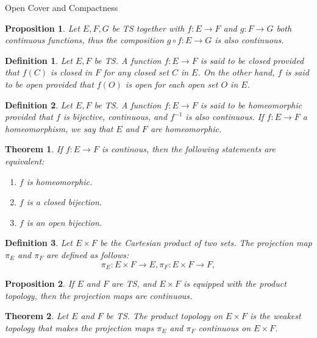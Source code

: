 \documentclass[12pt]{article}
\newtheorem{definition}{Definition}[section]
\newtheorem{proposition}{Proposition}[section]
\newtheorem{theorem}{Theorem}[section]
\begin{document}
\begin{section}{Open Cover and Compactness}
\begin{proposition}
	Let $E,F,G$ be TS together with $f:E\rightarrow F$ and $g:F\rightarrow G$ both continuous functions, thus the composition $g\circ f:E\rightarrow G$ is also continuous.
\end{proposition}

\begin{definition}
	Let $E,F$ be TS. A function $f:E\rightarrow F$ is said to be closed provided that $f(C)$ is closed in $F$ for any closed set $C$ in $E$.
	On the other hand, $f$ is said to be open provided that $f(O)$ is open for each open set $O$ in $E$.
\end{definition}


\begin{definition}
	Let $E, F$ be TS. A function $f:E\rightarrow F$ is said to be homeomorphic provided that $f$ is bijective, continuous, and $f^{-1}$ is also continuous. If $f:E\rightarrow F$ a homeomorphism, we say that $E$ and $F$ are homeomorphic.
\end{definition}

\begin{theorem}
	If $f:E\rightarrow F$ is continous, then the following statements are equivalent:
	\begin{enumerate}
		\item $f$ is homeomorphic.
		\item $f$ is a closed bijection.
		\item $f$ is an open bijection.
	\end{enumerate}
\end{theorem}

\begin{definition}
	Let $E\times F$ be the Cartesian product of two sets. The projection map $\pi_E$ and $\pi_F$ are defined as follows:
	\begin{displaymath}
  		\pi_E:E\times F\rightarrow E, \pi_F:E\times F\rightarrow F,
	\end{displaymath}
\end{definition}

\begin{proposition}
	If $E$ and $F$ are TS, and $E\times F$ is equipped with the product topology, then the projection maps are continuous.
\end{proposition}

\begin{theorem}
	Let $E$ and $F$ be TS. The product topology on $E\times F$ is the weakest topology that makes the projection maps $\pi_E$ and $\pi_F$ continuous on $E\times F$.
\end{theorem}


\end{section}
\end{document}
